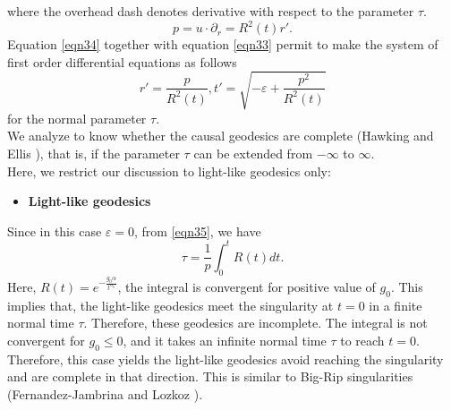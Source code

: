 \documentclass[11pt]{article}
\theoremstyle{theorem}
\theoremstyle{defi}
\begin{document}
where the overhead dash denotes derivative with respect to the parameter $\tau$. 
 \begin{equation}
 \label{eqn34}
 p=u\cdot\partial_{r}=R^2(t)r'.
 \end{equation}
Equation \eqref{eqn34} together with equation \eqref{eqn33} permit to make the system of first order differential equations as follows
\begin{equation}
\label{eqn35}
r'=\frac{p}{R^2(t)},  t'=\sqrt{-\varepsilon+\frac{p^2}{R^2(t)}}
\end{equation}
for the normal parameter $\tau$.\\
We analyze to know whether the causal geodesics are complete (Hawking and Ellis \cite{39}), that is, if the parameter $\tau$ can be extended from $-\infty$ to $\infty$. \\
Here, we restrict our discussion to light-like geodesics only:
\begin{itemize}
\item \textbf {Light-like geodesics}
\end{itemize}
Since in this case $\varepsilon=0$, from \eqref{eqn35}, we have
\begin{equation}
\label{eqn36}
\tau=\frac{1}{p}\int_{0}^{t}R(t)dt.
\end{equation}
Here, $\displaystyle{R(t)=e^{-\frac{g_0\alpha}{t^{n_0}}}}$, the integral is convergent for positive value of $g_0$. This implies that, the light-like geodesics meet the
singularity at $t=0$ in a finite normal time $\tau$. Therefore, these geodesics are incomplete. The integral is not convergent for $g_0\leq 0$, 
and it takes an infinite normal time $\tau$ to reach $t=0$. 
Therefore, this case yields the light-like geodesics avoid reaching the singularity and are complete in that direction.
This is similar to Big-Rip singularities (Fernandez-Jambrina and Lozkoz \cite{36}).
\end{document}
